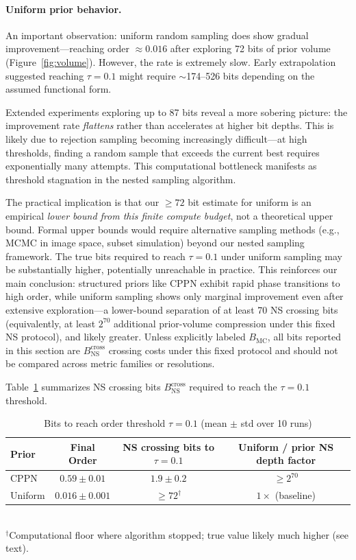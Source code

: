\documentclass{article}
\begin{document}
\paragraph{Uniform prior behavior.} An important observation: uniform random sampling does show gradual improvement---reaching order $\approx 0.016$ after exploring 72 bits of prior volume (Figure~\ref{fig:volume}). However, the rate is extremely slow. Early extrapolation suggested reaching $\tau=0.1$ might require $\sim$174--526 bits depending on the assumed functional form.

Extended experiments exploring up to 87 bits reveal a more sobering picture: the improvement rate \emph{flattens} rather than accelerates at higher bit depths. This is likely due to rejection sampling becoming increasingly difficult---at high thresholds, finding a random sample that exceeds the current best requires exponentially many attempts. This computational bottleneck manifests as threshold stagnation in the nested sampling algorithm.

The practical implication is that our $\ge72$ bit estimate for uniform is an empirical \emph{lower bound from this finite compute budget}, not a theoretical upper bound. Formal upper bounds would require alternative sampling methods (e.g., MCMC in image space, subset simulation) beyond our nested sampling framework. The true bits required to reach $\tau=0.1$ under uniform sampling may be substantially higher, potentially unreachable in practice. This reinforces our main conclusion: structured priors like CPPN exhibit rapid phase transitions to high order, while uniform sampling shows only marginal improvement even after extensive exploration---a lower-bound separation of at least 70 NS crossing bits (equivalently, at least $2^{70}$ additional prior-volume compression under this fixed NS protocol), and likely greater. Unless explicitly labeled $B_{\text{MC}}$, all bits reported in this section are $B_{\text{NS}}^{\text{cross}}$ crossing costs under this fixed protocol and should not be compared across metric families or resolutions.

Table~\ref{tab:prior_comparison} summarizes NS crossing bits $B_{\text{NS}}^{\text{cross}}$ required to reach the $\tau = 0.1$ threshold.

\begin{table}[H]
\centering
\caption{Bits to reach order threshold $\tau = 0.1$ (mean $\pm$ std over 10 runs)}
\label{tab:prior_comparison}
\begin{tabular}{lccc}
\toprule
Prior & Final Order & NS crossing bits to $\tau=0.1$ & Uniform / prior NS depth factor \\
\midrule
CPPN & $0.59 \pm 0.01$ & $1.9 \pm 0.2$ & $\geq 2^{70}$ \\
Uniform & $0.016 \pm 0.001$ & $\geq 72^\dagger$ & $1\times$ (baseline) \\
\bottomrule
\end{tabular}
\\[2pt]
{\footnotesize $^\dagger$Computational floor where algorithm stopped; true value likely much higher (see text).}
\end{table}
\end{document}
